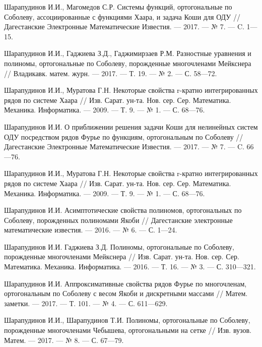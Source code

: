 \begin{thebibliography}{111}
Шарапудинов И.И., Магомедов С.Р. Системы функций, ортогональные по Соболеву, ассоциированные с функциями Хаара, и задача Коши для ОДУ // Дагестанские Электронные Математические Известия. --- 2017. --- № 7. --- C. 1---15.

Шарапудинов И.И., Гаджиева З.Д., Гаджимирзаев Р.М. Разностные уравнения и полиномы, ортогональные по Соболеву, порожденные многочленами Мейкснера // Владикавк. матем. журн. --- 2017. --- Т. 19. --- № 2. --- С. 58---72.

Шарапудинов И.И., Муратова Г.Н. Некоторые свойства r-кратно интегрированных рядов по системе Хаара // Изв. Сарат. ун-та. Нов. сер. Сер. Математика. Механика. Информатика. --- 2009. --- Т. 9. --- № 1. --- С. 68---76.


Шарапудинов И.И. О приближении решения задачи Коши для нелинейных систем ОДУ посредством рядов Фурье по функциям, ортогональным по Соболеву // Дагестанские Электронные Математические Известия. --- 2017. --- № 7. --- C. 66---76.

Шарапудинов И.И., Муратова Г.Н. Некоторые свойства r-кратно интегрированных рядов по системе Хаара // Изв. Сарат. ун-та. Нов. сер. Сер. Математика. Механика. Информатика. --- 2009. --- Т. 9. --- № 1. --- С. 68---76.

Шарапудинов И.И.  Асимптотические свойства полиномов, ортогональных по Соболеву, порожденных полиномами Якоби // Дагестанские электронные математические известия. --- 2016. --- № 6. --- С. 1---24.

Шарапудинов И.И. Гаджиева З.Д. Полиномы, ортогональные по Соболеву, порожденные многочленами Мейкснера // Изв. Сарат. ун-та. Нов. сер. Сер. Математика. Механика. Информатика. --- 2016. --- Т. 16. --- № 3. --- С. 310---321.

Шарапудинов И.И. Аппроксимативные свойства рядов Фурье по многочленам, ортогональным по Соболеву с весом Якоби и дискретными массами // Матем. заметки. --- 2017. --- Т. 101. --- № 4. --- С. 611---629.

Шарапудинов И.И., Шарапудинов Т.И. Полиномы, ортогональные по Соболеву, порожденные многочленами Чебышева, ортогональными на сетке // Изв. вузов. Матем. --- 2017. --- № 8. --- С. 67---79.


\end{thebibliography}
